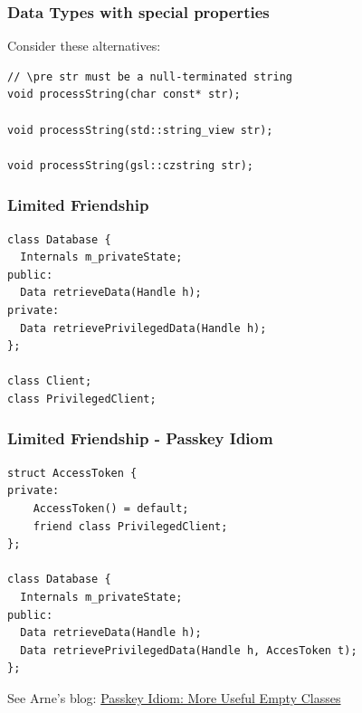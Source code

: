 \documentclass[aspectratio=169]{beamer}
\begin{document}
\begin{frame}[fragile]
  \frametitle{Data Types with special properties}

Consider these alternatives:
  \begin{lstlisting}[style=cpp20]
// \pre str must be a null-terminated string
void processString(char const* str);

void processString(std::string_view str);

void processString(gsl::czstring str);
  \end{lstlisting}
\end{frame}
\fi

\begin{frame}[fragile]
  \frametitle{Limited Friendship}
  
  \begin{lstlisting}[style=cpp20]
class Database {
  Internals m_privateState;
public:
  Data retrieveData(Handle h);
private:
  Data retrievePrivilegedData(Handle h);
};

class Client;
class PrivilegedClient;
  \end{lstlisting}
  
\end{frame}

\begin{frame}[fragile]
  \frametitle{Limited Friendship - Passkey Idiom}
  
  \begin{lstlisting}[style=cpp20]
struct AccessToken {
private:
    AccessToken() = default;
    friend class PrivilegedClient;
};

class Database {
  Internals m_privateState;
public:
  Data retrieveData(Handle h);
  Data retrievePrivilegedData(Handle h, AccesToken t);
};
  \end{lstlisting}
  
  See Arne's blog: \href{https://arne-mertz.de/2016/10/passkey-idiom/}{Passkey Idiom: More Useful Empty Classes}
\end{frame}
\end{document}
